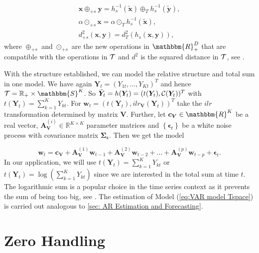 \begin{gather}
\bm{x} \oplus_{+s} \bm{y} = h_s^{-1}(\tilde{\bm{x}}) \oplus_T  h_s^{-1}(\tilde{\bm{y}}), \\
\alpha \odot_{+s} \bm{x} = \alpha \odot_T h_s^{-1}(\tilde{\bm{x}}), \\
d_{+s}^2(\bm{x},\bm{y}) = d_T^2(h_s(\bm{x},\bm{y})),
\label{eq:Vector Space Operations sum}
\end{gather}
%
where $\oplus_{+s}$ and $\odot_{+s}$ are the new operations in $\mathbbm{R}_+^D$ that are compatible with the operations in $\mathcal{T}$ and $d^2$ is the squared distance in $\mathcal{T}$, see \textcite{Pawlowsky:2013}. 

With the structure established, we can model the relative structure and total sum in one model.  We have again $\bm{Y}_t=(Y_{1t},\ldots,Y_{Kt})^T$ and hence $\Tsp = \mathbb{R}_+ \times \mathbbm{S}^K$. So $\tilde{\bm{Y}}_t=h(\bm{Y}_t)=(t(\bm{Y}_t),\mathcal{C}(\bm{Y}_t))^T$ with $t(\bm{Y}_t)=\sum_{k=1}^K Y_{kt}$. For $\bm{w}_t =(t(\bm{Y}_t),ilr_{\bm{V}}(\bm{Y}_t))^T$ take the $ilr$ transformation determined by matrix $\bm{V}$. Further, let $\bm{c}_{\bm{V}} \in \mathbbm{R}^K$ be a real vector, $\textbf{A}_{\textbf{V}}^{(i)} \in \mathbb{R}^{K \times K}$ parameter matrices and $\left\{\bm{\epsilon}_t\right\}$ be a white noise process with covariance matrix $\bm{\Sigma_\epsilon}$. Then we get the model 

\begin{equation}
\textbf{w}_t = \textbf{c}_{\textbf{V}} + \textbf{A}_{\textbf{V}}^{(1)}\textbf{w}_{t-1} + \textbf{A}_{\textbf{V}}^{(2)}\textbf{w}_{t-2} + \ldots + \textbf{A}_{\textbf{V}}^{(p)}\textbf{w}_{t-p} + \bm{\epsilon}_{t}.
\label{eq:VAR model Tspace}
\end{equation}
%
In our application, we will use $t(\bm{Y}_t)=\sum_{k=1}^K Y_{kt}$ or $t(\bm{Y}_t)=\log(\sum_{k=1}^K Y_{kt})$ since we are interested in the total sum at time $t$. The logarithmic sum is a popular choice in the time series context as it prevents the sum of being too big, see \textcite{Kynclova:2015}. The estimation of Model (\ref{eq:VAR model Tspace}) is carried out analogous to \ref{sec: AR Estimation and Forecasting}. 

\section{Zero Handling}
\label{sec: Zero-Handling}


